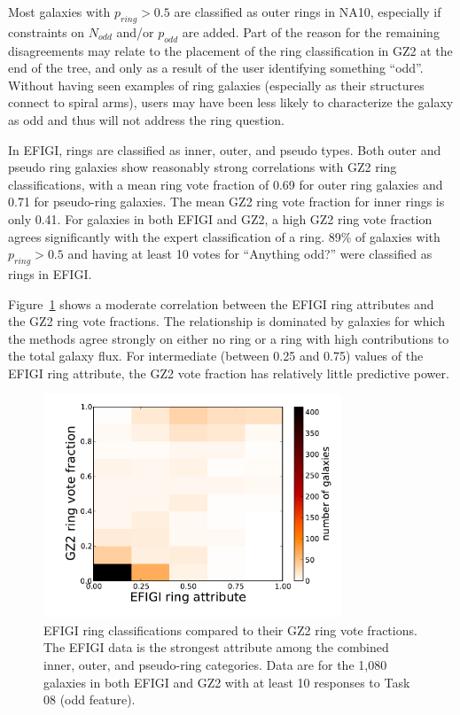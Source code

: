 \documentclass[useAMS,usenatbib]{mn2e}
\begin{document}
Most galaxies with $p_{ring}>0.5$ are classified as outer rings in NA10, especially if constraints on $N_{odd}$ and/or $p_{odd}$ are added. Part of the reason for the remaining disagreements may relate to the placement of the ring classification in GZ2 at the end of the tree, and only as a result of the user identifying something ``odd''. Without having seen examples of ring galaxies (especially as their structures connect to spiral arms), users may have been less likely to characterize the galaxy as odd and thus will not address the ring question. 

In EFIGI, rings are classified as inner, outer, and pseudo types. Both outer and pseudo ring galaxies show reasonably strong correlations with GZ2 ring classifications, with a mean ring vote fraction of 0.69 for outer ring galaxies and 0.71 for pseudo-ring galaxies. The mean GZ2 ring vote fraction for inner rings is only 0.41. For galaxies in both EFIGI and GZ2, a high GZ2 ring vote fraction agrees significantly with the expert classification of a ring. 89\% of galaxies with $p_{ring}>0.5$ and having at least 10 votes for ``Anything odd?'' were classified as rings in EFIGI. 

Figure~\ref{fig-efigi_rings} shows a moderate correlation between the EFIGI ring attributes and the GZ2 ring vote fractions. The relationship is dominated by galaxies for which the methods agree strongly on either no ring or a ring with high contributions to the total galaxy flux. For intermediate (between 0.25 and 0.75) values of the EFIGI ring attribute, the GZ2 vote fraction has relatively little predictive power. %

\begin{figure}
\includegraphics[angle=0,width=3.5in]{figures/efigi_rings.pdf}
\caption{EFIGI ring classifications compared to their GZ2 ring vote fractions. The EFIGI data is the strongest attribute among the combined inner, outer, and pseudo-ring categories. Data are for the 1,080 galaxies in both EFIGI and GZ2 with at least 10 responses to Task 08 (odd feature). 
\label{fig-efigi_rings}}
\end{figure}
\end{document}
